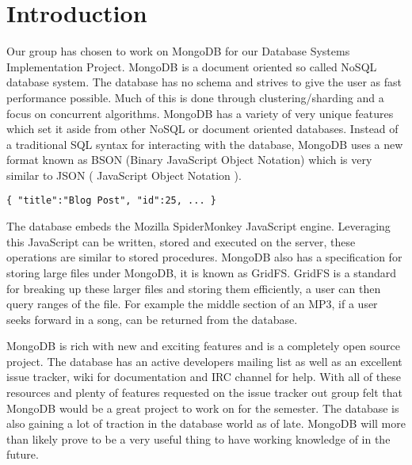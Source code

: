 \documentclass{dependencies/acm_proc_article-sp}
\begin{document}
\footnotemark
{}
%

%
\section{Introduction}
Our group has chosen to work on MongoDB for our Database Systems
Implementation Project. MongoDB is a document oriented so called NoSQL
database system. The database has no schema and strives to give the user
as fast performance possible. Much of this is done through clustering/sharding
and a focus on concurrent algorithms. MongoDB has a variety of very unique
features which set it aside from other NoSQL or document oriented databases.
Instead of a traditional SQL syntax for interacting with the database, MongoDB uses
a new format known as BSON (Binary JavaScript Object Notation) which is very similar
to JSON ( JavaScript Object Notation ).
\begin{lstlisting}
{ "title":"Blog Post", "id":25, ... }
\end{lstlisting}The database embeds the Mozilla SpiderMonkey JavaScript engine.
Leveraging this JavaScript can be written, stored and executed on the server, these
operations are similar to stored procedures. MongoDB also has a specification for storing
large files under MongoDB, it is known as GridFS. GridFS is a standard for breaking up these larger
files and storing them efficiently, a user can then query ranges of the file. For example the middle section
of an MP3, if a user seeks forward in a song, can be returned from the database.

MongoDB is rich with new and exciting features and is a completely open source project.
The database has an active developers mailing list as well as an excellent issue tracker,
wiki for documentation and IRC channel for help. With all of these resources and plenty
of features requested on the issue tracker out group felt that MongoDB would be a great
project to work on for the semester. The database is also gaining a lot of traction in the
database world as of late. MongoDB will more than likely prove to be a very useful thing
to have working knowledge of in the future.
\end{document}
